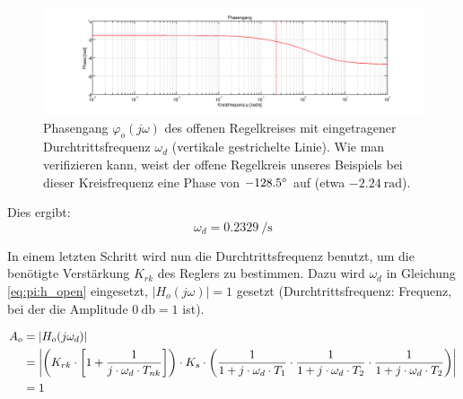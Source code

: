 \begin{figure}[h! width=\pagewidth]
    \includegraphics[width=\textwidth]{images/piOffenerRegelkreisPhasengang.png}
    \caption{%
        Phasengang   $\varphi_o(j\omega)$   des   offenen   Regelkreises   mit
        eingetragener Durchtrittsfrequenz $\omega_{d}$ (vertikale gestrichelte
        Linie). Wie man verifizieren kann, weist der offene Regelkreis unseres
        Beispiels bei dieser Kreisfrequenz  eine Phase von $-128.5\degree$ auf
        (etwa $\SI{-2.24}{\radian}$).
    }
    \label{fig:pi:omega_d}
\end{figure}

Dies ergibt:
\begin{equation} \label{eq:pi:omega_d}
    \omega_d = \SI{0.2329}{\per\second}
\end{equation}

In  einem  letzten  Schritt  wird  nun  die  Durchtrittsfrequenz  benutzt,  um
die  ben\"otigte Verst\"arkung  $K_{rk}$ des  Reglers zu  bestimmen. Dazu wird
$\omega_d$ in  Gleichung \ref{eq:pi:h_open}  eingesetzt, $|H_o(j\omega)|  = 1$
gesetzt    (Durchtrittsfrequenz: Frequenz,     bei    der     die    Amplitude
$\SI{0}{\decibel} = 1$ ist).

\begin{gather} \label{eq:pi:A_o_set_to_one}
    \begin{split}
        A_o & = | H_o (j\omega_d) | \\
            & = \abs*{
                    \bigg(
                        K_{rk} \cdot \biggl[ 1 + \frac{1}{j \cdot \omega_d \cdot T_{nk}} \biggr]
                    \bigg)
                    \cdot
                    K_s
                    \cdot
                    \bigg(
                            \frac{1}{1 + j \cdot \omega_d \cdot T_1}
                      \cdot \frac{1}{1 + j \cdot \omega_d \cdot T_2}
                      \cdot \frac{1}{1 + j \cdot \omega_d \cdot T_2}
                      \bigg)} \\
              & = 1
    \end{split}
\end{gather}

